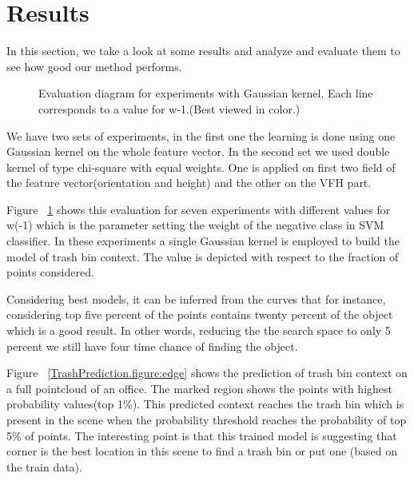 \section{Results}
\label{Results.sec}
In this section, we take a look at some results and analyze and evaluate them to see how good our method performs.



\begin{figure}[t]
  \caption[Evaluation diagram for experiments with Gaussian kernel.]
  {Evaluation diagram for experiments with Gaussian kernel. Each line corresponds to a value for w-1.(Best viewed in color.)}
  \label{evalSevenExp.figure}
\end{figure}
We have two sets of experiments, in the first one the learning is done using one Gaussian kernel on the whole feature vector.
In the second set we used double kernel of type chi-square with equal weights.
One is applied on first two field of the feature vector(orientation and height) and the other on the VFH part.

Figure ~\ref{evalSevenExp.figure} shows this evaluation for seven experiments with different values for w(-1) which is the 
parameter setting the weight of the negative class in SVM classifier.
In these experiments a single Gaussian kernel is employed to build the model of trash bin context.
The value is depicted with respect to the fraction of points considered.

Considering best models, it can be inferred from the curves that for instance, considering top five percent of the points 
contains twenty percent of the object which is a good result. 
In other words, reducing the the search space to only 5 percent we still have four time chance of finding the object.



Figure ~\ref{TrashPrediction.figure:edge} shows the prediction of trash bin context on a full pointcloud of an office. 
The marked region shows the points with highest probability values(top 1\%).
This predicted context reaches the trash bin which is present in the scene when the probability threshold reaches the 
probability of top 5\% of points.
The interesting point is that this trained model is suggesting that corner is the best location in this scene to find a 
trash bin or put one (based on the train data).

